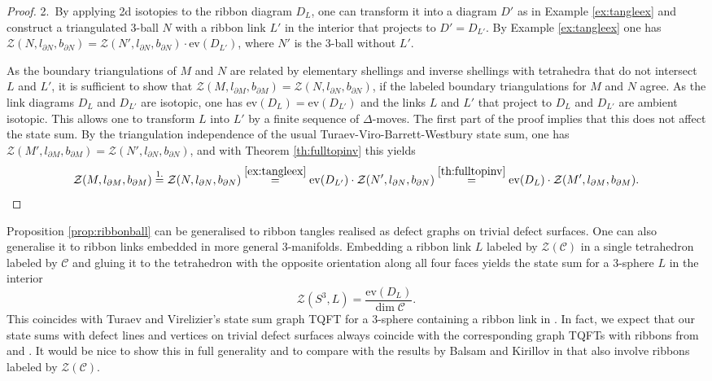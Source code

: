 \documentclass[1.5pt, a4paper]{article}
\newcommand{\mac}{\mathcal C}
\begin{document}
\begin{proof}
2.~By applying 2d isotopies to the ribbon diagram $D_L$, one can transform it into a diagram $D'$ as in Example \ref{ex:tangleex} and construct a triangulated 3-ball $N$ with a ribbon link $L'$ in the interior that projects to $D'=D_{L'}$.  By Example \ref{ex:tangleex} one has
$\mathcal Z(N, l_{\partial N}, b_{\partial N})=\mathcal Z(N', l_{\partial N}, b_{\partial N})\cdot \mathrm{ev}(D_{L'})$, where $N'$ is the 3-ball  without $L'$.  

As the boundary triangulations of $M$ and $N$ are related by elementary shellings and inverse shellings with tetrahedra that do not intersect $L$ and $L'$, it is sufficient to show that  $\mathcal Z(M, l_{\partial M}, b_{\partial M})=\mathcal Z(N, l_{\partial N}, b_{\partial N})$, if the labeled boundary triangulations for $M$ and $N$ agree. 
As the link diagrams $D_L$ and $D_{L'}$ are isotopic, one has $\mathrm{ev}(D_{L})=\mathrm{ev}(D_{L'})$ and the links $L$ and $L'$ that project to $D_L$ and $D_{L'}$ are ambient isotopic. This allows one to transform $L$ into $L'$ by a finite sequence of $\Delta$-moves. The first part of the proof implies that this does not affect the state sum. By the triangulation independence of the usual Turaev-Viro-Barrett-Westbury state sum, one has $\mathcal Z(M', l_{\partial M}, b_{\partial M})=\mathcal Z(N', l_{\partial N}, b_{\partial N})$, and with
Theorem \ref{th:fulltopinv} this yields
$$\mathcal Z(M, l_{\partial M}, b_{\partial M})\stackrel{1.}=\mathcal Z(N, l_{\partial N}, b_{\partial N})\stackrel{\ref{ex:tangleex}}=\mathrm{ev}(D_{L'})\cdot \mathcal Z(N', l_{\partial N}, b_{\partial N})\stackrel{\ref{th:fulltopinv}}=\mathrm{ev}(D_{L})\cdot \mathcal Z(M', l_{\partial M}, b_{\partial M}).$$
\end{proof}

Proposition \ref{prop:ribbonball} can be generalised  to  ribbon tangles realised as defect graphs on trivial defect surfaces. One can also generalise it to ribbon links embedded  in more general 3-manifolds. Embedding a ribbon link $L$ labeled by $\mathcal Z(\mac)$ in a single tetrahedron labeled by $\mac$ and gluing it to the  tetrahedron with the opposite orientation  along all four faces yields the state sum for a 3-sphere  $L$  in the interior
$$\mathcal Z(S^3,L)=\frac{\mathrm{ev}(D_L)} {\dim \mac}.$$
This coincides with Turaev and Virelizier's  state sum graph TQFT  for a 3-sphere containing a ribbon link in  \cite[Th.~16.1]{TVbook}.  In fact, we expect that our state sums with defect lines and vertices on trivial defect surfaces always coincide with the corresponding  graph TQFTs with ribbons from \cite[Ch.~16]{TVbook} and \cite{TVr}.  It would  be nice to show this in full generality and  to compare with the results by Balsam and Kirillov in  \cite{KB,B} that also involve ribbons labeled by $\mathcal Z(\mac)$. 
\end{document}
